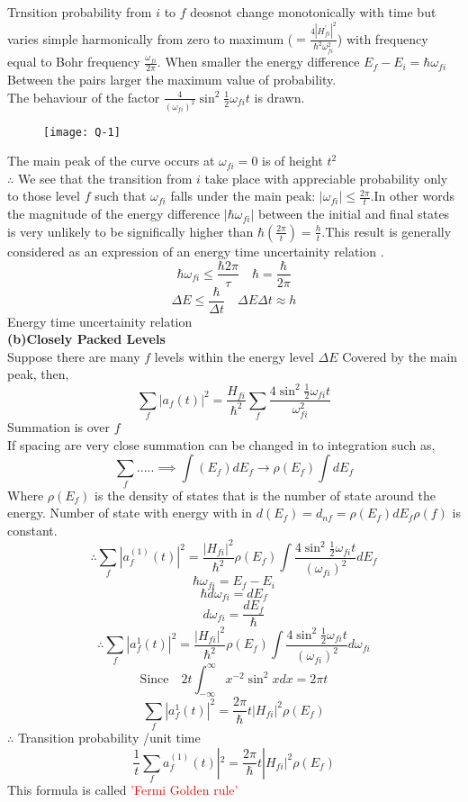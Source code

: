Trnsition probability from $i$ to $f$ deosnot change monotonically with time but varies simple harmonically from zero to maximum ($=\frac{4|H^\prime_{fi}|^2}{\hbar^2\omega_{fi}^2}$) with frequency equal to Bohr frequency $\frac{\omega_{fi}}{2\pi}$. When smaller the energy difference $E_f-E_i=\hbar\omega_{fi}$ Between the pairs larger the maximum value of probability.\\
The behaviour of the factor $\frac{4}{(\omega_{fi})^2}\sin^2\frac{1}{2}\omega_{fi}t$ is drawn.\\
\begin{figure}[H]
	\centering
	\texttt{[image: Q-1]}
\end{figure}
The main peak of the curve occurs at $\omega_{fi}=0$ is of height $t^2$\\
$\therefore$ We see that the transition from $i$ take place with appreciable probability only to those level $f$ such that $\omega_{fi}$ falls under the main peak: $|\omega_{fi}|\leq \frac{2\pi}{t}$.In other words the magnitude of the energy difference
$|\hbar\omega_{fi}|$ between the initial and final states is very unlikely to be significally higher than $\hbar(\frac{2\pi}{t})=\frac{h}{t}$.This result is  generally considered as an expression of an energy time uncertainity relation .\\
$$\hbar\omega_{fi}\leq\frac{\hbar2\pi}{\tau}\quad\hbar=\frac{\hbar}{2\pi}$$
$$\Delta E\leq \frac{\hbar}{\Delta t}\quad \Delta E\Delta t\approx h$$
Energy time uncertainity relation\\
\textbf{(b)\quad Closely Packed Levels}\\
Suppose there are many $f$ levels within the energy level $\Delta E$ Covered by the main peak, then,\\
$$\sum_{f}|a_f(t)|^2=\frac{H_{fi}}{\hbar^2}\sum_{f}\frac{4\sin^2 \frac{1}{2}\omega_{fi}t}{\omega^2_{fi}}$$
Summation is over $f$\\
If spacing are very close summation can be changed in to integration such as,
$$\sum_{f}.....\implies \int(E_f)dE_f\rightarrow\rho(E_f)\int dE_f$$
Where $\rho(E_f)$ is the density of states that is the number of state around the energy. 
Number of state with energy with in $d(E_f)=d_{nf}=\rho(E_f)dE_f \rho(f)$ is constant.
$$\therefore \sum_{f}|a^{(1)}_f(t)|^2=\frac{|H_{fi}|^2}{\hbar^2}\rho(E_f)\int\frac{4\sin^2\frac{1}{2}\omega_{fi}t}{(\omega_{fi})^2}dE_f$$
$$\hbar\omega_{fi}=E_f-E_i$$
$$\hbar d\omega_{fi}=dE_f$$
$$ d\omega_{fi}=\frac{dE_f}{\hbar}$$
$$\therefore\sum_{f}|a^{1}_f(t)|^2=\frac{|H_{fi}|^2}{\hbar^2}\rho(E_f)\int\frac{4\sin^2\frac{1}{2}\omega_{fi}t}{(\omega_{fi})^2}d\omega_{fi}$$
$$\text{Since} \quad 2t\int_{-\infty}^{\infty}x^{-2}\sin^2xdx=2\pi t$$
$$\sum_{f}|a^{1}_f(t)|^2=\frac{2\pi}{\hbar}t|H_{fi}|^2\rho(E_f)$$
$\therefore$ Transition probability /unit time
$$\frac{1}{t}\sum_{f}a^{(1)}_f(t)|^2=\frac{2\pi}{\hbar}t|H_{fi}|^2\rho(E_f)$$
This formula is called \textcolor{red}{'Fermi Golden rule'}
